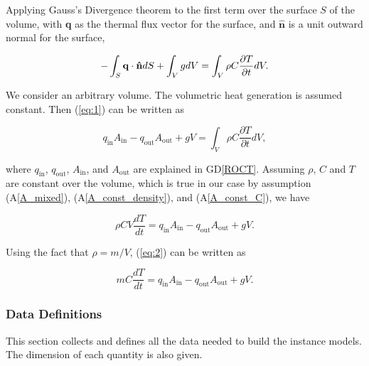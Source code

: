 \documentclass[12pt]{article}
\newcommand{\dref}[1]{GD\ref{#1}}
\newcommand{\aref}[1]{A\ref{#1}}
\begin{document}
\noindent
Applying Gauss's Divergence theorem to the first term over the surface $S$ of
the volume, with
\textbf{q} as the thermal flux vector for the surface, and {$\mathbf{\hat n}$} is
a unit outward normal for the surface,

\begin{equation}
-\int_S{ \bf{q\cdot \hat n}} dS+\int_V g dV= \int_V \rho C \frac{\partial T}{\partial t}dV. \label{eq:1}
\end{equation}

\noindent
We consider an arbitrary volume.  The volumetric heat generation is assumed
constant.  Then (\ref{eq:1}) can be written as


\begin{equation*}
  q_{\mathrm{in}} A_{\mathrm{in}} - q_{\mathrm{out}} A_{\mathrm{out}} + g V = \int_V \rho C \frac{\partial T}{\partial t}dV,
\end{equation*}

\noindent where $q_{\mathrm{in}}$, $q_{\mathrm{out}}$, $A_{\mathrm{in}}$, and 
$A_{\mathrm{out}}$ are explained in \dref{ROCT}.  Assuming $\rho$, $C$ and $T$ are
constant over the volume, which is true in our case by assumption (\aref{A_mixed}),
(\aref{A_const_density}), and (\aref{A_const_C}), we have

\begin{equation}
\rho C V\frac{dT}{dt} = q_{\mathrm{in}} A_{\mathrm{in}} - q_{\mathrm{out}} A_{\mathrm{out}} + g V. \label{eq:2}
\end{equation}

\noindent
Using the fact that $\rho = {m}/{V}$, (\ref{eq:2}) can be written as

\begin{equation*}
m C \frac{dT}{dt} = q_{\mathrm{in}} A_{\mathrm{in}} - q_{\mathrm{out}} A_{\mathrm{out}} + g V.
\end{equation*}

\subsubsection{Data Definitions}\label{sec_datadef}

This section collects and defines all the data needed to build the instance
models. The dimension of each quantity is also given.
\end{document}
